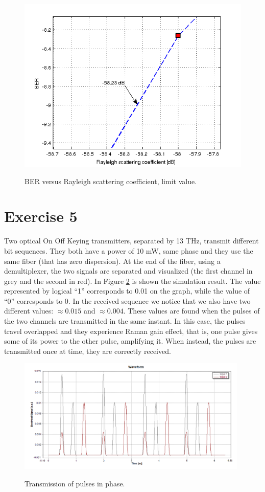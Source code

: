 \documentclass[a4paper,10pt]{report}
\begin{document}
\begin{figure}[!h]
  \centering
  \includegraphics[width=12cm]{es4zoom.png}\\
  \caption{BER versus Rayleigh scattering coefficient, limit value.}
  \label{es4zoom}
\end{figure}


\newpage
\section*{Exercise 5}
Two optical On Off Keying transmitters, separated by 13 THz, transmit different bit sequences. They both have a power of 10 mW, same phase and
they use the same fiber (that has zero dispersion). At the end of the fiber, using a demultiplexer, the two signals are separated and visualized (the first
channel in grey and the second in red). In Figure \ref{es5} is shown the simulation result.
The value represented by logical ``1'' corresponds to 0.01 on the graph, while the value of ``0'' corresponds to 0.
In the received sequence we notice that we also have two different values: $\approx 0.015$ and $\approx 0.004$.
These values are found when the pulses of the two channels are transmitted in the same instant. In this case, 
the pulses travel overlapped and they experience Raman gain effect, that is, one pulse gives some of its power to the other pulse, amplifying it.
When instead, the pulses are transmitted once at time, they are correctly received.

\begin{figure}[!ht]
  \centering
  \includegraphics[width=11cm]{es5.png}\\
  \caption{Transmission of pulses in phase.}
  \label{es5}
\end{figure}
\end{document}
